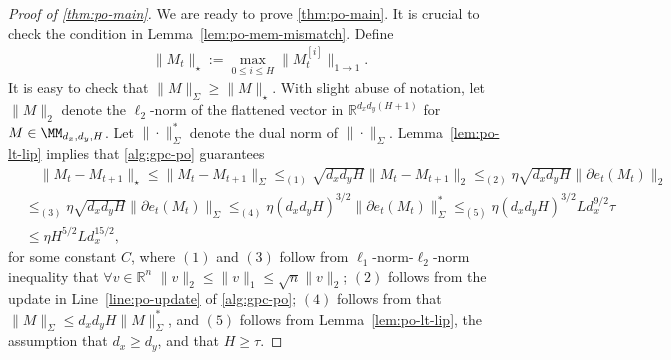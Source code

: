 \begin{proof} [Proof of \cref{thm:po-main}]
We are ready to prove \cref{thm:po-main}. It is crucial to check the condition in Lemma~\ref{lem:po-mem-mismatch}. Define
\begin{align*}
\|M_t\|_{\star}:=\max_{0\le i\le H}\|M_{t}^{[i]}\|_{1\rightarrow 1}.
\end{align*}
It is easy to check that $\|M\|_{\Sigma}\ge \|M\|_{\star}$. With slight abuse of notation, let $\|M\|_2$ denote the $\ell_2$-norm of the flattened vector in $\mathbb{R}^{d_xd_y(H+1)}$ for $M\in\MM_{d_x,d_y,H}$. Let $\|\cdot\|_{\Sigma}^*$ denote the dual norm of $\|\cdot\|_{\Sigma}$. Lemma~\ref{lem:po-lt-lip} implies that
\cref{alg:gpc-po} guarantees
\begin{align*}
& \quad \|M_{t}-M_{t+1}\|_{\star}\le\|M_{t}-M_{t+1}\|_{\Sigma}\le_{(1)} \sqrt{d_xd_yH}\|M_{t}-M_{t+1}\|_2\le_{(2)} \eta \sqrt{d_xd_yH} \|\partial e_t(M_t)\|_{2}\\
&\le_{(3)}\eta \sqrt{d_xd_yH}\|\partial e_t(M_t)\|_{\Sigma}\le_{(4)} \eta (d_xd_yH)^{3/2} \|\partial e_t(M_t)\|_{\Sigma}^{*}\le_{(5)} \eta(d_xd_yH)^{3/2}Ld_x^{9/2}\tau\\
&\le \eta H^{5/2}Ld_x^{15/2}, 
\end{align*}
for some constant $C$, where $(1)$ and $(3)$ follow from $\ell_1$-norm-$\ell_2$-norm inequality that $\forall v\in\mathbb{R}^n$ $\|v\|_2\le \|v\|_1\le\sqrt{n}\|v\|_2$; $(2)$ follows from the update in Line~\ref{line:po-update} of \cref{alg:gpc-po};
$(4)$ follows from that $\|M\|_{\Sigma}\le d_xd_yH\|M\|_{\Sigma}^*$, and $(5)$ follows from Lemma~\ref{lem:po-lt-lip}, the assumption that $d_x\ge d_y$, and that $H\ge \tau$. 


\end{proof}

